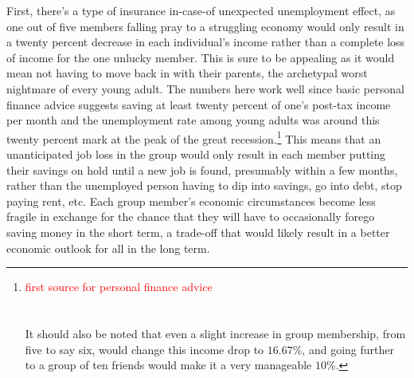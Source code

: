 \documentclass{article}[10pt]
\begin{document}
First, there's a type of insurance in-case-of unexpected unemployment effect, as one out of five members falling pray to a struggling economy would only result in a twenty percent decrease in each individual's income rather than a complete loss of income for the one unlucky member.
This is sure to be appealing as it would mean not having to move back in with their parents, the archetypal worst nightmare of every young adult.
The numbers here work well since basic personal finance advice suggests saving at least twenty percent of one's post-tax income per month and the unemployment rate among young adults was around this twenty percent mark at the peak of the great recession.\footnote{
    \textcolor{red}{first source for personal finance advice} \\
    \indent \indent {} \\
    \vspace{-0.1in} \\
    \indent \indent It should also be noted that even a slight increase in group membership, from five to say six, would change this income drop to $16.67\%$, and going further to a group of ten friends would make it a very manageable $10\%$. }
This means that an unanticipated job loss in the group would only result in each member putting their savings on hold until a new job is found, presumably within a few months, rather than the unemployed person having to dip into savings, go into debt, stop paying rent, etc.
Each group member's economic circumstances become less fragile in exchange for the chance that they will have to occasionally forego saving money in the short term, a trade-off that would likely result in a better economic outlook for all in the long term.\par 
\end{document}
